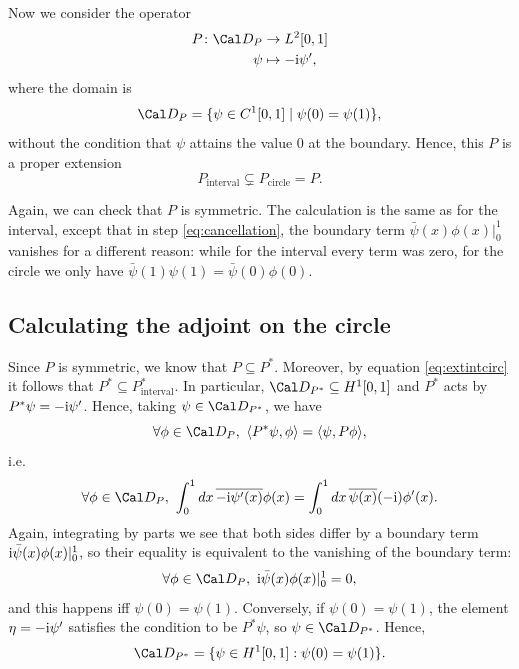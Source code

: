 Now we consider the operator
\begin{align}
  P \colon \Cal D_P &\to L^{2}[0,1] \\
  \psi &\mapsto -\ic\psi'
,\end{align}
where the domain is
\begin{equation}
  \Cal D_P = \{\psi\in C^{1}[0,1] \mid \psi(0)=\psi(1)\},
\end{equation}
without the condition that \(\psi\) attains the value \(0\) at the
boundary. Hence, this \(P\) is a proper extension
\begin{equation}
  \label{eq:extintcirc}
  P_{\text{interval}}
  \subsetneq
  P_{\text{circle}} = P
.\end{equation}

Again, we can check that \(P\) is symmetric. The calculation is the
same as for the interval, except that in step \eqref{eq:cancellation},
the boundary term \(\bar\psi(x)\phi(x)|_0^{1}\) vanishes for a
different reason: while for the interval every term was zero,
for the circle we only have \(\bar\psi(1)\psi(1)=\bar\psi(0)\phi(0)\).

\subsection{Calculating the adjoint on the circle}

Since \(P\) is symmetric, we know that \(P\subseteq P^{*}\).
Moreover, by equation \eqref{eq:extintcirc} it follows that
\(P^{*}\subseteq P^{*}_\text{interval}\). In particular, \(\Cal
D_{P^{*}}\subseteq H^{1}[0,1]\) and \(P^*\)
acts by \(P^*\psi=-\mathrm{i}\psi'\).
Hence, taking \(\psi\in\Cal D_{P^{*}}\), we have
\begin{equation}
  \forall\phi\in\Cal D_P, \
  \langle P^*\psi, \phi \rangle
  =
  \langle \psi, P\phi \rangle
,\end{equation}
i.e.
\begin{equation}
  \forall\phi\in\Cal D_P, \
  \int_{0}^{1}dx\, \overline{-\ic\psi'(x)}\phi(x)
  =
  \int_{0}^{1}dx\, \overline{\psi(x)}(-\ic)\phi'(x)
.\end{equation}
Again, integrating by parts we see that both sides differ by a
boundary term \(\mathrm{i}\bar\psi(x)\phi(x)|_{0}^{1}\), so their equality is
equivalent to the vanishing of the boundary term:
\begin{align}
  \forall\phi\in\Cal D_P, \
  \ic\bar\psi(x)\phi(x)|_{0}^{1} = 0
,\end{align}
and this happens iff \(\psi(0)=\psi(1)\).
Conversely, if \(\psi(0)=\psi(1)\), the element \(\eta=-\mathrm{i}\psi'\)
satisfies the condition to be \(P^{*}\psi\), so \(\psi\in\Cal
D_{P^{*}}\).
Hence,
\begin{equation}
  \Cal D_{P^*} = \{\psi\in H^{1}[0,1] : \psi(0)=\psi(1)\}
.\end{equation}

